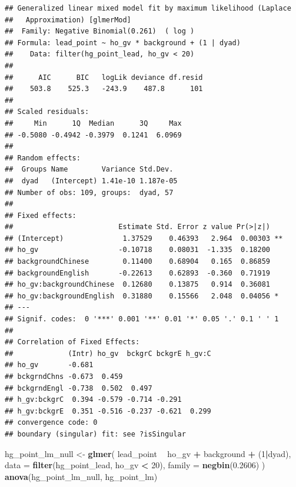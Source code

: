 \documentclass[]{article}
\newenvironment{Shaded}{\begin{snugshade}}{\end{snugshade}}
\newcommand{\DataTypeTok}[1]{\textcolor[rgb]{0.13,0.29,0.53}{#1}}
\newcommand{\DecValTok}[1]{\textcolor[rgb]{0.00,0.00,0.81}{#1}}
\newcommand{\FloatTok}[1]{\textcolor[rgb]{0.00,0.00,0.81}{#1}}
\newcommand{\KeywordTok}[1]{\textcolor[rgb]{0.13,0.29,0.53}{\textbf{#1}}}
\newcommand{\NormalTok}[1]{#1}
\newcommand{\OperatorTok}[1]{\textcolor[rgb]{0.81,0.36,0.00}{\textbf{#1}}}
\newcommand{\StringTok}[1]{\textcolor[rgb]{0.31,0.60,0.02}{#1}}
\begin{document}
\begin{verbatim}
## Generalized linear mixed model fit by maximum likelihood (Laplace
##   Approximation) [glmerMod]
##  Family: Negative Binomial(0.261)  ( log )
## Formula: lead_point ~ ho_gv * background + (1 | dyad)
##    Data: filter(hg_point_lead, ho_gv < 20)
## 
##      AIC      BIC   logLik deviance df.resid 
##    503.8    525.3   -243.9    487.8      101 
## 
## Scaled residuals: 
##     Min      1Q  Median      3Q     Max 
## -0.5080 -0.4942 -0.3979  0.1241  6.0969 
## 
## Random effects:
##  Groups Name        Variance Std.Dev. 
##  dyad   (Intercept) 1.41e-10 1.187e-05
## Number of obs: 109, groups:  dyad, 57
## 
## Fixed effects:
##                         Estimate Std. Error z value Pr(>|z|)   
## (Intercept)              1.37529    0.46393   2.964  0.00303 **
## ho_gv                   -0.10718    0.08031  -1.335  0.18200   
## backgroundChinese        0.11400    0.68904   0.165  0.86859   
## backgroundEnglish       -0.22613    0.62893  -0.360  0.71919   
## ho_gv:backgroundChinese  0.12680    0.13875   0.914  0.36081   
## ho_gv:backgroundEnglish  0.31880    0.15566   2.048  0.04056 * 
## ---
## Signif. codes:  0 '***' 0.001 '**' 0.01 '*' 0.05 '.' 0.1 ' ' 1
## 
## Correlation of Fixed Effects:
##             (Intr) ho_gv  bckgrC bckgrE h_gv:C
## ho_gv       -0.681                            
## bckgrndChns -0.673  0.459                     
## bckgrndEngl -0.738  0.502  0.497              
## h_gv:bckgrC  0.394 -0.579 -0.714 -0.291       
## h_gv:bckgrE  0.351 -0.516 -0.237 -0.621  0.299
## convergence code: 0
## boundary (singular) fit: see ?isSingular
\end{verbatim}

\begin{Shaded}
\begin{Highlighting}[]
\NormalTok{hg_point_lm_null <-}\StringTok{ }\KeywordTok{glmer}\NormalTok{(}
\NormalTok{  lead_point }\OperatorTok{~}
\StringTok{    }\NormalTok{ho_gv }\OperatorTok{+}
\StringTok{    }\NormalTok{background }\OperatorTok{+}
\StringTok{    }\NormalTok{(}\DecValTok{1}\OperatorTok{|}\NormalTok{dyad),}
  \DataTypeTok{data =} \KeywordTok{filter}\NormalTok{(hg_point_lead, ho_gv }\OperatorTok{<}\StringTok{ }\DecValTok{20}\NormalTok{),}
  \DataTypeTok{family =} \KeywordTok{negbin}\NormalTok{(}\FloatTok{0.2606}\NormalTok{)}
\NormalTok{)}
\KeywordTok{anova}\NormalTok{(hg_point_lm_null, hg_point_lm)}
\end{Highlighting}
\end{Shaded}
\end{document}
